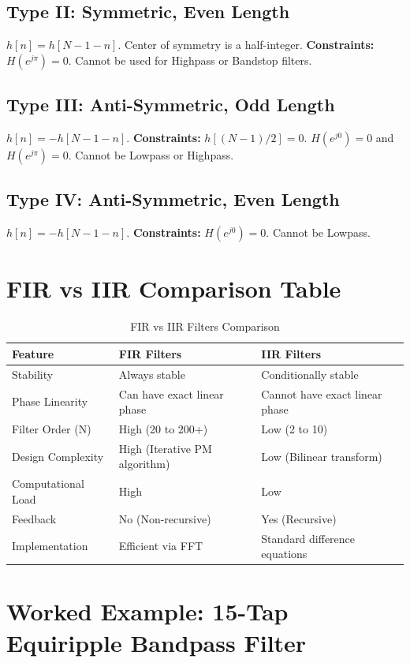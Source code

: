 \documentclass[11pt,a4paper]{article}
\begin{document}
\subsection{Type II: Symmetric, Even Length}
$h[n] = h[N-1-n]$. Center of symmetry is a half-integer. \textbf{Constraints:} $H(e^{j\pi}) = 0$. Cannot be used for Highpass or Bandstop filters.

\subsection{Type III: Anti-Symmetric, Odd Length}
$h[n] = -h[N-1-n]$. \textbf{Constraints:} $h[(N-1)/2] = 0$. $H(e^{j0}) = 0$ and $H(e^{j\pi}) = 0$. Cannot be Lowpass or Highpass.

\subsection{Type IV: Anti-Symmetric, Even Length}
$h[n] = -h[N-1-n]$. \textbf{Constraints:} $H(e^{j0}) = 0$. Cannot be Lowpass.

\section{FIR vs IIR Comparison Table}

\begin{table}[H]
\centering
\caption{FIR vs IIR Filters Comparison}
\begin{tabular}{l p{6cm} p{6cm}}
\toprule
\textbf{Feature} & \textbf{FIR Filters} & \textbf{IIR Filters} \\
\midrule
Stability & Always stable & Conditionally stable \\
Phase Linearity & Can have exact linear phase & Cannot have exact linear phase \\
Filter Order (N) & High (20 to 200+) & Low (2 to 10) \\
Design Complexity & High (Iterative PM algorithm) & Low (Bilinear transform) \\
Computational Load & High & Low \\
Feedback & No (Non-recursive) & Yes (Recursive) \\
Implementation & Efficient via FFT & Standard difference equations \\
\bottomrule
\end{tabular}
\end{table}

\section{Worked Example: 15-Tap Equiripple Bandpass Filter}
\end{document}
